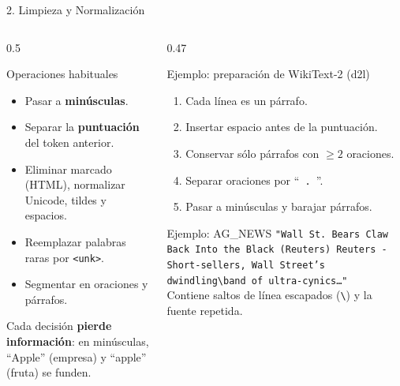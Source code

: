 \documentclass[aspectratio=169, 10pt]{beamer}
\newcommand{\tok}[1]{\texttt{#1}}
\begin{document}
\begin{frame}{2. Limpieza y Normalizaci\'on}

	\begin{columns}[T]
		\begin{column}{0.5\textwidth}
			\begin{block}{Operaciones habituales}
				\small
				\begin{itemize}
					\item Pasar a \textbf{min\'usculas}.
					\item Separar la \textbf{puntuaci\'on} del token anterior.
					\item Eliminar marcado (HTML), normalizar Unicode, tildes y espacios.
					\item Reemplazar palabras raras por \tok{<unk>}.
					\item Segmentar en oraciones y p\'arrafos.
				\end{itemize}
			\end{block}

			\vspace{0.1cm}
			{\small Cada decisi\'on \textbf{pierde informaci\'on}: en min\'usculas, ``Apple'' (empresa) y ``apple'' (fruta) se funden.}
		\end{column}

		\begin{column}{0.47\textwidth}
			\begin{block}{Ejemplo: preparaci\'on de WikiText-2 (d2l)}
				\small
				\begin{enumerate}
					\item Cada l\'inea es un p\'arrafo.
					\item Insertar espacio antes de la puntuaci\'on.
					\item Conservar s\'olo p\'arrafos con $\geq 2$ oraciones.
					\item Separar oraciones por ``\tok{ . }''.
					\item Pasar a min\'usculas y barajar p\'arrafos.
				\end{enumerate}
			\end{block}

			\begin{block}{Ejemplo: AG\_NEWS}
				\scriptsize
				\texttt{"Wall St.\ Bears Claw Back Into the Black (Reuters) Reuters - Short-sellers, Wall Street's dwindling\textbackslash band of ultra-cynics\ldots"}\\[2pt]
				Contiene saltos de l\'inea escapados (\texttt{\textbackslash}) y la fuente repetida.
			\end{block}
		\end{column}
	\end{columns}

\end{frame}
\end{document}
